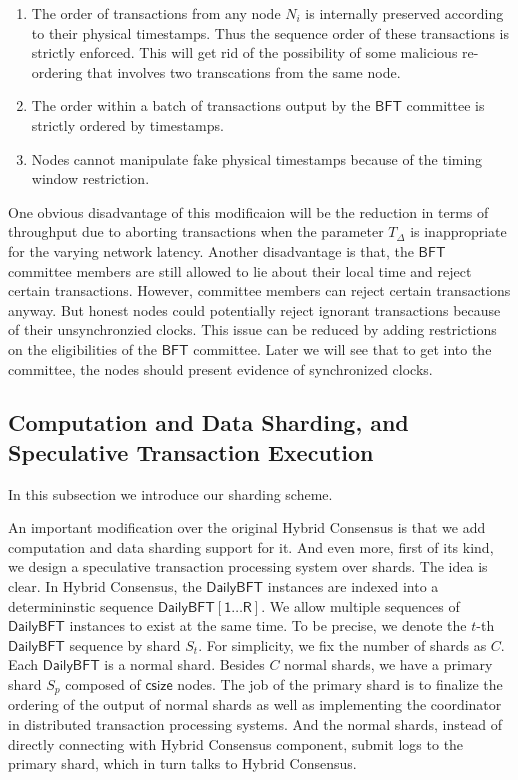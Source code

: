 \documentclass[9pt,oneside]{amsart}
\begin{document}
\begin{multicols}{2}
\begin{enumerate}
\item The order of transactions from any node $N_i$ is internally preserved according to their physical timestamps. Thus the sequence order of these transactions
is strictly enforced. This will get rid of the possibility of some malicious re-ordering that involves two transcations from the same node.
\item The order within a batch of transactions output by the $\mathsf{BFT}$ committee is strictly ordered by timestamps.
\item Nodes cannot manipulate fake physical timestamps because of the timing window restriction.
\end{enumerate}

One obvious disadvantage of this modificaion will be the reduction in terms of throughput due to aborting transactions when the parameter $T_\Delta$ is inappropriate
for the varying network latency. Another disadvantage is that, the $\mathsf{BFT}$ committee members are still allowed to lie about their local time and reject certain
transactions. However, committee members can reject certain transactions anyway. But honest nodes could potentially reject ignorant transactions because of their
unsynchronzied clocks. This issue can be reduced by adding restrictions on the eligibilities of the $\mathsf{BFT}$ committee. Later we will see that to get into
the committee, the nodes should present evidence of synchronized clocks.

\subsection{Computation and Data Sharding, and Speculative Transaction Execution}
In this subsection we introduce our sharding scheme.

An important modification over the original Hybrid Consensus is that we add computation and data sharding support for it. And even more, first of its kind,
we design a speculative transaction processing system over shards. The idea is clear. In Hybrid Consensus, the $\mathsf{DailyBFT}$ instances are indexed into
a determininstic sequence $\mathsf{DailyBFT[1\dots R]}$. We allow multiple sequences of $\mathsf{DailyBFT}$ instances to exist at the same time. To be precise,
we denote the $t$-th $\mathsf{DailyBFT}$ sequence by shard $S_t$. For simplicity, we fix the number of shards as $C$. Each $\mathsf{DailyBFT}$ is a normal shard.
Besides $C$ normal shards, we have a primary shard $S_p$ composed of $\mathsf{csize}$ nodes. The job of the primary shard is to finalize the ordering of the
output of normal shards as well as implementing the coordinator in distributed transaction processing systems. And the normal shards, instead of directly connecting
with Hybrid Consensus component, submit logs to the primary shard, which in turn talks to Hybrid Consensus.


\end{multicols}
\end{document}
